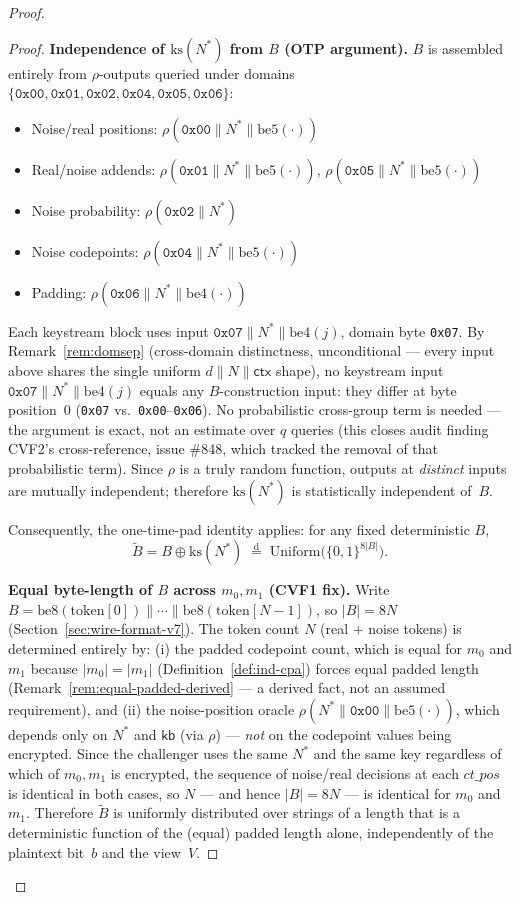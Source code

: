 \documentclass[11pt,a4paper]{article}
\begin{document}
\begin{proof}
\begin{proof}
\smallskip
\noindent\textbf{Independence of $\mathrm{ks}(N^*)$ from $B$ (OTP argument).}
$B$ is assembled entirely from $\rho$-outputs queried under domains
$\{\texttt{0x00},\texttt{0x01},\texttt{0x02},\texttt{0x04},\texttt{0x05},\texttt{0x06}\}$:
\begin{itemize}
  \item Noise/real positions: $\rho(\texttt{0x00}\|N^*\|\mathrm{be5}(\cdot))$
  \item Real/noise addends: $\rho(\texttt{0x01}\|N^*\|\mathrm{be5}(\cdot))$,
        $\rho(\texttt{0x05}\|N^*\|\mathrm{be5}(\cdot))$
  \item Noise probability: $\rho(\texttt{0x02}\|N^*)$
  \item Noise codepoints: $\rho(\texttt{0x04}\|N^*\|\mathrm{be5}(\cdot))$
  \item Padding: $\rho(\texttt{0x06}\|N^*\|\mathrm{be4}(\cdot))$
\end{itemize}
Each keystream block uses input $\texttt{0x07}\|N^*\|\mathrm{be4}(j)$, domain
byte \texttt{0x07}.
By Remark~\ref{rem:domsep} (cross-domain distinctness, unconditional — every
input above shares the single uniform $d\|N\|\mathsf{ctx}$ shape), no
keystream input $\texttt{0x07}\|N^*\|\mathrm{be4}(j)$ equals any $B$-construction
input: they differ at byte position~$0$ (\texttt{0x07} vs.\ \texttt{0x00}--\texttt{0x06}).
No probabilistic cross-group term is needed — the argument is exact, not an
estimate over $q$ queries (this closes audit finding CVF2's cross-reference,
issue \#848, which tracked the removal of that probabilistic term).
Since $\rho$ is a truly random function, outputs at \emph{distinct} inputs
are mutually independent; therefore
$\mathrm{ks}(N^*)$ is statistically independent of~$B$.

Consequently, the one-time-pad identity applies: for any fixed deterministic $B$,
\[
  \tilde{B}
  = B \oplus \mathrm{ks}(N^*)
  \;\overset{\mathrm{d}}{=}\;
  \mathrm{Uniform}\bigl(\{0,1\}^{8|B|}\bigr).
\]

\smallskip
\noindent\textbf{Equal byte-length of $B$ across $m_0, m_1$ (CVF1 fix).}
Write $B = \mathrm{be8}(\mathrm{token}[0]) \| \cdots \| \mathrm{be8}(\mathrm{token}[N-1])$, so
$|B| = 8N$ (Section~\ref{sec:wire-format-v7}). The token count $N$ (real $+$
noise tokens) is determined entirely by: (i) the padded codepoint count,
which is equal for $m_0$ and $m_1$ because $|m_0|=|m_1|$
(Definition~\ref{def:ind-cpa}) forces equal padded length
(Remark~\ref{rem:equal-padded-derived} --- a derived fact, not an assumed
requirement), and (ii) the noise-position oracle
$\rho(N^*\|\texttt{0x00}\|\mathrm{be5}(\cdot))$, which depends only on
$N^*$ and $\mathsf{kb}$ (via $\rho$) --- \emph{not} on the codepoint values
being encrypted. Since the challenger uses the same $N^*$ and the same key
regardless of which of $m_0, m_1$ is encrypted, the sequence of
noise/real decisions at each $ct\_pos$ is identical in both cases, so $N$ ---
and hence $|B| = 8N$ --- is identical for $m_0$ and $m_1$. Therefore $\tilde{B}$
is uniformly distributed over strings of a length that is a deterministic
function of the (equal) padded length alone, independently of the
plaintext bit~$b$ and the view~$V$.


\end{proof}
\end{proof}
\end{document}

